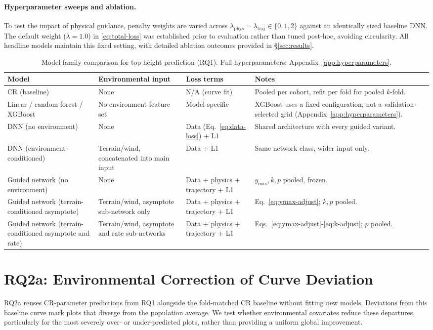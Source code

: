 \documentclass[logo,msc,ai]{infthesis}           %
\begin{document}
\paragraph*{Hyperparameter sweeps and ablation.}
To test the impact of physical guidance, penalty weights are varied across $\lambda_{\text{phys}} = \lambda_{\text{traj}} \in \{0, 1, 2\}$ against an identically sized baseline DNN. The default weight ($\lambda = 1.0$) in \eqref{eq:total-loss} was established prior to evaluation rather than tuned post-hoc, avoiding circularity. All headline models maintain this fixed setting, with detailed ablation outcomes provided in \S\ref{sec:results}.
\begin{table}[!htbp]
\scriptsize
\renewcommand{\arraystretch}{1.2}
\begin{tabular}{p{3.2cm}p{3cm}p{2.6cm}p{4.5cm}}
\toprule
Model & Environmental input & Loss terms & Notes \\
\midrule
CR (baseline) & None & N/A (curve fit) & Pooled per cohort, refit per fold for pooled $k$-fold. \\
Linear / random forest / XGBoost & No-environment feature set & Model-specific & XGBoost uses a
fixed configuration, not a validation-selected grid (Appendix~\ref{app:hyperparameters}). \\
DNN (no environment) & None & Data (Eq.~\ref{eq:data-loss}) + L1 & Shared architecture with every
guided variant. \\
DNN (environment-conditioned) & Terrain/wind, concatenated into main input & Data + L1 & Same
network class, wider input only. \\
Guided network (no environment) & None & Data + physics + trajectory + L1 & $y_{\max},k,p$
pooled, frozen. \\
Guided network (terrain-conditioned asymptote) & Terrain/wind, asymptote sub-network only & Data +
physics + trajectory + L1 & Eq.~\ref{eq:ymax-adjust}; $k,p$ pooled. \\
Guided network (terrain-conditioned asymptote and rate) & Terrain/wind, asymptote and rate
sub-networks & Data + physics + trajectory + L1 & Eqs.~\ref{eq:ymax-adjust}-\ref{eq:k-adjust};
$p$ pooled. \\
\bottomrule
\end{tabular}
\caption{Model family comparison for top-height prediction (RQ1). Full hyperparameters:
Appendix~\ref{app:hyperparameters}.}
\label{tab:rq1-models}
\end{table}

\section{RQ2a: Environmental Correction of Curve Deviation}
RQ2a reuses CR-parameter predictions from RQ1 alongside the fold-matched CR baseline without fitting new models. Deviations from this baseline curve mark plots that diverge from the population average. We test whether environmental covariates reduce these departures, particularly for the most severely over- or under-predicted plots, rather than providing a uniform global improvement.
\end{document}
